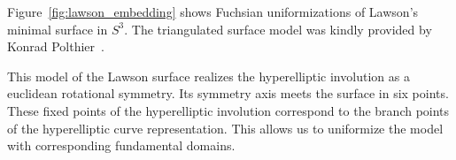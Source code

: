 \documentclass[Thesis]{subfiles}
\begin{document}
Figure~\ref{fig:lawson_embedding} shows Fuchsian uniformizations of
Lawson's minimal surface in $S^{3}$. The triangulated surface
model was kindly provided by Konrad Polthier~\cite{polthier97}.

This model of the Lawson surface realizes the hyperelliptic involution
as a euclidean rotational symmetry.  Its symmetry axis meets the
surface in six points. These fixed points of the hyperelliptic
involution correspond to the branch points of the hyperelliptic curve
representation. This allows us to uniformize the model with
corresponding fundamental domains. 



\end{document}
